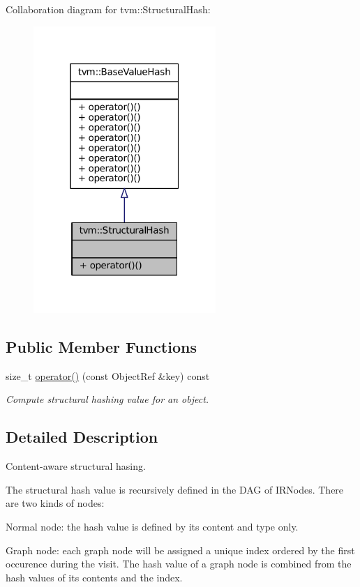 Collaboration diagram for tvm\+:\+:Structural\+Hash\+:
\nopagebreak
\begin{figure}[H]
\begin{center}
\leavevmode
\includegraphics[width=196pt]{classtvm_1_1StructuralHash__coll__graph}
\end{center}
\end{figure}
\subsection*{Public Member Functions}
\begin{DoxyCompactItemize}
\item 
size\+\_\+t \hyperlink{classtvm_1_1StructuralHash_a9854ccfc7f91fc98094accac82edaf26}{operator()} (const Object\+Ref \&key) const 
\begin{DoxyCompactList}\small\item\em Compute structural hashing value for an object. \end{DoxyCompactList}\end{DoxyCompactItemize}


\subsection{Detailed Description}
Content-\/aware structural hasing. 

The structural hash value is recursively defined in the D\+AG of I\+R\+Nodes. There are two kinds of nodes\+:


\begin{DoxyItemize}
\item Normal node\+: the hash value is defined by its content and type only.
\item Graph node\+: each graph node will be assigned a unique index ordered by the first occurence during the visit. The hash value of a graph node is combined from the hash values of its contents and the index. 
\end{DoxyItemize}

